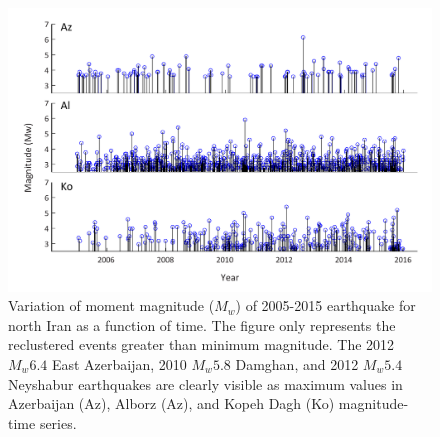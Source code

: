\begin{figure} [ht]
\centering
\includegraphics[scale=0.8]{figures/pdf/Figure05.pdf} 
\caption{Variation of moment magnitude ($M_w$) of 2005-2015 earthquake for north Iran as a function of time. The figure only represents the reclustered events greater than minimum magnitude. The 2012 $M_w 6.4$ East Azerbaijan, 2010 $M_w 5.8$ Damghan, and 2012 $M_w 5.4$ Neyshabur earthquakes are clearly visible as maximum values in Azerbaijan (Az),  Alborz (Az), and Kopeh Dagh (Ko) magnitude-time series.}
\label{fig:mag-time}
\end{figure} 

 


